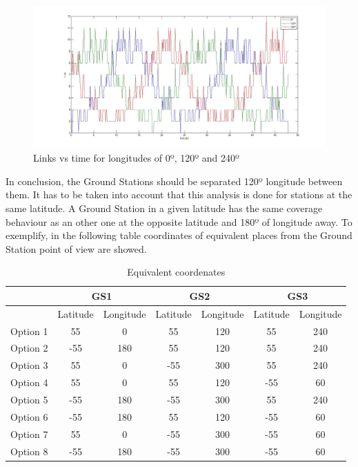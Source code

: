 \begin{figure}[H]
\begin{center}
\includegraphics[scale=0.30]{0_120_240_long.jpg}
\caption{Links vs time for longitudes of 0º, 120º and 240º}
\end{center}
\end{figure}
In conclusion, the Ground Stations should be separated 120º longitude between them. It has to be taken into account that this analysis is done for stations at the same latitude. A Ground Station in a given latitude has the same coverage behaviour as an other one at the opposite latitude and 180º of longitude away. To exemplify, in the following table coordinates of equivalent places from the Ground Station point of view are showed. 
\begin{table}[H]
\begin{center}
\begin{tabular}{|c|c|c|c|c|c|c|}
\hline 
 & \multicolumn{2}{c|}{GS1} & \multicolumn{2}{c|}{GS2} & \multicolumn{2}{c|}{GS3} \\ 
\hline 
 & Latitude & Longitude & Latitude & Longitude & Latitude & Longitude \\ 
\hline 
Option 1 & 55 & 0 & 55 & 120 & 55 & 240 \\ 
\hline 
Option 2 & -55 & 180 & 55 & 120 & 55 & 240 \\ 
\hline 
Option 3 & 55 & 0 & -55 & 300 & 55 & 240 \\ 
\hline 
Option 4 & 55 & 0 & 55 & 120 & -55 & 60 \\ 
\hline 
Option 5 & -55 & 180 & -55 & 300 & 55 & 240 \\ 
\hline 
Option 6 & -55 & 180 & 55 & 120 & -55 & 60 \\ 
\hline 
Option 7 & 55 & 0 & -55 & 300 & -55 & 60 \\ 
\hline 
Option 8 & -55 & 180 & -55 & 300 & -55 & 60 \\ 
\hline 
\end{tabular}
\caption{Equivalent coordenates}
\end{center}
\end{table}
